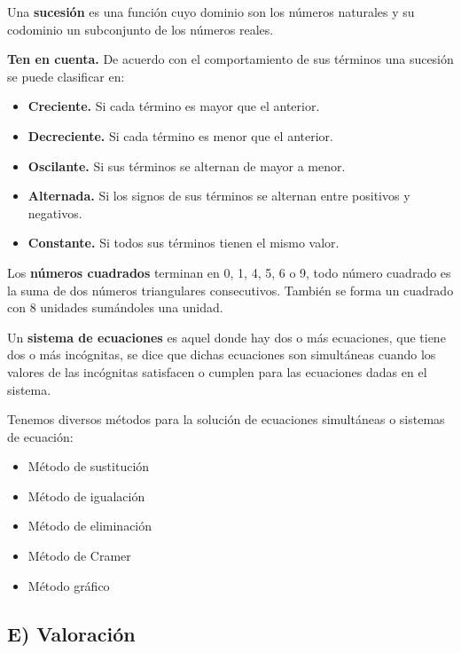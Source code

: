 \documentclass[12pt,a4paper]{article}
\begin{document}
Una \textbf{sucesión} es una función cuyo dominio son los números naturales y su codominio un subconjunto de los números reales.

\textbf{Ten en cuenta.} De acuerdo con el comportamiento de sus términos una sucesión se puede clasificar en:

\begin{itemize}
    \item \textbf{Creciente.} Si cada término es mayor que el anterior.
    \item \textbf{Decreciente.} Si cada término es menor que el anterior.
    \item \textbf{Oscilante.} Si sus términos se alternan de mayor a menor.
    \item \textbf{Alternada.} Si los signos de sus términos se alternan entre positivos y negativos.
    \item \textbf{Constante.} Si todos sus términos tienen el mismo valor.
\end{itemize}

Los \textbf{números cuadrados} terminan en 0, 1, 4, 5, 6 o 9, todo número cuadrado es la suma de dos números triangulares consecutivos. También se forma un cuadrado con 8 unidades sumándoles una unidad.

Un \textbf{sistema de ecuaciones} es aquel donde hay dos o más ecuaciones, que tiene dos o más incógnitas, se dice que dichas ecuaciones son simultáneas cuando los valores de las incógnitas satisfacen o cumplen para las ecuaciones dadas en el sistema.

Tenemos diversos métodos para la solución de ecuaciones simultáneas o sistemas de ecuación:

\begin{itemize}
    \item Método de sustitución
    \item Método de igualación
    \item Método de eliminación
    \item Método de Cramer
    \item Método gráfico
\end{itemize}

\vspace{1.5cm}

\subsection*{E) Valoración}
\end{document}
